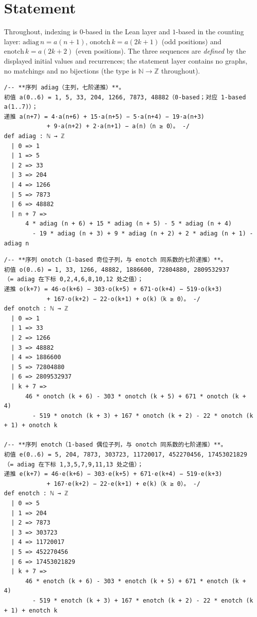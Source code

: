 \documentclass[11pt]{article}
\theoremstyle{definition}
\begin{document}
\section{Statement}\label{sec:statement}

Throughout, indexing is $0$-based in the Lean layer and $1$-based in the
counting layer: $\mathrm{adiag}\,n=a(n+1)$,
$\mathrm{onotch}\,k=a(2k+1)$ (odd positions) and
$\mathrm{enotch}\,k=a(2k+2)$ (even positions). The three sequences are
\emph{defined} by the displayed initial values and recurrences; the statement
layer contains no graphs, no matchings and no bijections (the type is
$\mathbb{N}\to\mathbb{Z}$ throughout).

\begin{lstlisting}[caption={Sequence \lean{adiag} (main sequence), verbatim from
the frozen statement file \texttt{formalized/01-comb07-diagnotch-statements.lean}
(lines 39--53, sha256 \texttt{16744fd3}).},label={lst:adiag}]
/-- **序列 adiag（主列，七阶递推）**。
初值 a(0..6) = 1, 5, 33, 204, 1266, 7873, 48882（0-based；对应 1-based a(1..7)）；
递推 a(n+7) = 4·a(n+6) + 15·a(n+5) − 5·a(n+4) − 19·a(n+3)
            + 9·a(n+2) + 2·a(n+1) − a(n)（n ≥ 0）。 -/
def adiag : ℕ → ℤ
  | 0 => 1
  | 1 => 5
  | 2 => 33
  | 3 => 204
  | 4 => 1266
  | 5 => 7873
  | 6 => 48882
  | n + 7 =>
      4 * adiag (n + 6) + 15 * adiag (n + 5) - 5 * adiag (n + 4)
        - 19 * adiag (n + 3) + 9 * adiag (n + 2) + 2 * adiag (n + 1) - adiag n
\end{lstlisting}

\begin{lstlisting}[caption={Sequences \lean{onotch} and \lean{enotch} (the two
subsequences, same coefficients), verbatim from the frozen statement file
(lines 55--87, sha256 \texttt{16744fd3}).},label={lst:sub}]
/-- **序列 onotch（1-based 奇位子列，与 enotch 同系数的七阶递推）**。
初值 o(0..6) = 1, 33, 1266, 48882, 1886600, 72804880, 2809532937
（= adiag 在下标 0,2,4,6,8,10,12 处之值）；
递推 o(k+7) = 46·o(k+6) − 303·o(k+5) + 671·o(k+4) − 519·o(k+3)
            + 167·o(k+2) − 22·o(k+1) + o(k)（k ≥ 0）。 -/
def onotch : ℕ → ℤ
  | 0 => 1
  | 1 => 33
  | 2 => 1266
  | 3 => 48882
  | 4 => 1886600
  | 5 => 72804880
  | 6 => 2809532937
  | k + 7 =>
      46 * onotch (k + 6) - 303 * onotch (k + 5) + 671 * onotch (k + 4)
        - 519 * onotch (k + 3) + 167 * onotch (k + 2) - 22 * onotch (k + 1) + onotch k

/-- **序列 enotch（1-based 偶位子列，与 onotch 同系数的七阶递推）**。
初值 e(0..6) = 5, 204, 7873, 303723, 11720017, 452270456, 17453021829
（= adiag 在下标 1,3,5,7,9,11,13 处之值）；
递推 e(k+7) = 46·e(k+6) − 303·e(k+5) + 671·e(k+4) − 519·e(k+3)
            + 167·e(k+2) − 22·e(k+1) + e(k)（k ≥ 0）。 -/
def enotch : ℕ → ℤ
  | 0 => 5
  | 1 => 204
  | 2 => 7873
  | 3 => 303723
  | 4 => 11720017
  | 5 => 452270456
  | 6 => 17453021829
  | k + 7 =>
      46 * enotch (k + 6) - 303 * enotch (k + 5) + 671 * enotch (k + 4)
        - 519 * enotch (k + 3) + 167 * enotch (k + 2) - 22 * enotch (k + 1) + enotch k
\end{lstlisting}
\end{document}
